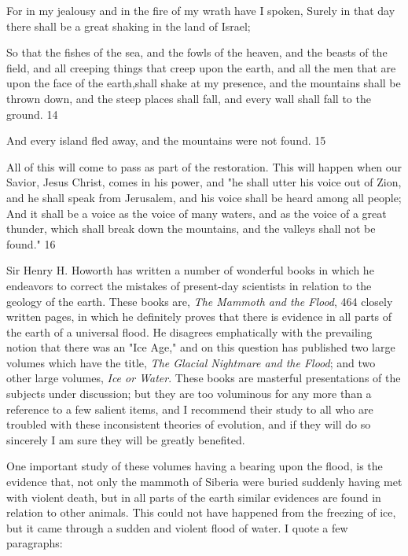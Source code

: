 For in my jealousy and in the fire of my wrath have I spoken, Surely in that day there shall be
a great shaking in the land of Israel;

So that the fishes of the sea, and the fowls of the heaven, and the beasts of the field, and all
creeping things that creep upon the earth, and all the men that are upon the face of the earth,shall shake at my presence, and the mountains shall be thrown down, and the steep places
shall fall, and every wall shall fall to the ground. 14

And every island fled away, and the mountains were not found. 15

All of this will come to pass as part of the restoration. This will happen when our Savior,
Jesus Christ, comes in his power, and "he shall utter his voice out of Zion, and he shall speak
from Jerusalem, and his voice shall be heard among all people; And it shall be a voice as the
voice of many waters, and as the voice of a great thunder, which shall break down the
mountains, and the valleys shall not be found." 16

Sir Henry H. Howorth has written a number of wonderful books in which he endeavors to
correct the mistakes of present-day scientists in relation to the geology of the earth. These
books are, \textit{The Mammoth and the Flood}, 464 closely written pages, in which he definitely
proves that there is evidence in all parts of the earth of a universal flood. He disagrees
emphatically with the prevailing notion that there was an "Ice Age," and on this question has
published two large volumes which have the title, \textit{The Glacial Nightmare and the Flood}; and
two other large volumes, \textit{Ice or Water}. These books are masterful presentations of the
subjects under discussion; but they are too voluminous for any more than a reference to a few
salient items, and I recommend their study to all who are troubled with these inconsistent
theories of evolution, and if they will do so sincerely I am sure they will be greatly benefited.

One important study of these volumes having a bearing upon the flood, is the evidence that,
not only the mammoth of Siberia were buried suddenly having met with violent death, but in
all parts of the earth similar evidences are found in relation to other animals. This could not
have happened from the freezing of ice, but it came through a sudden and violent flood of
water. I quote a few paragraphs:

